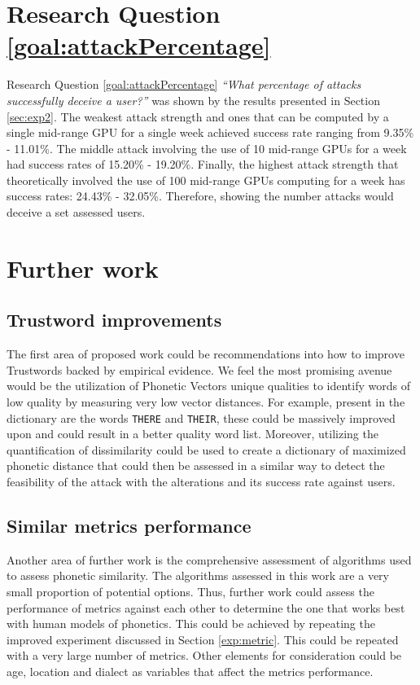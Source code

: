 \section{Research Question \ref{goal:attackPercentage}}
Research Question \ref{goal:attackPercentage} \textit{``What percentage of attacks successfully deceive a user?''} was shown by the results presented in Section \ref{sec:exp2}. The weakest attack strength and ones that can be computed by a single mid-range GPU for a single week achieved success rate ranging from 9.35\% - 11.01\%. The middle attack involving the use of 10 mid-range GPUs for a week had success rates of 15.20\% - 19.20\%. Finally, the highest attack strength that theoretically involved the use of 100 mid-range GPUs computing for a week has success rates: 24.43\% - 32.05\%. Therefore, showing the number attacks would deceive a set assessed users.

\section{Further work}

\subsection*{Trustword improvements}
The first area of proposed work could be recommendations into how to improve Trustwords backed by empirical evidence. We feel the most promising avenue would be the utilization of Phonetic Vectors unique qualities to identify words of low quality by measuring very low vector distances. For example, present in the dictionary are the words \verb|THERE| and \verb|THEIR|, these could be massively improved upon and could result in a better quality word list. Moreover, utilizing the quantification of dissimilarity could be used to create a dictionary of maximized phonetic distance that could then be assessed in a similar way to detect the feasibility of the attack with the alterations and its success rate against users.

\subsection*{Similar metrics performance}
Another area of further work is the comprehensive assessment of algorithms used to assess phonetic similarity. The algorithms assessed in this work are a very small proportion of potential options. Thus, further work could assess the performance of metrics against each other to determine the one that works best with human models of phonetics. This could be achieved by repeating the improved experiment discussed in Section \ref{exp:metric}. This could be repeated with a very large number of metrics. Other elements for consideration could be age, location and dialect as variables that affect the metrics performance. 

